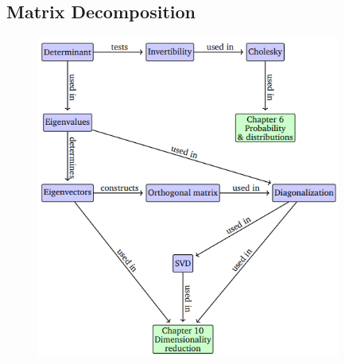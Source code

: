 \subsection{Matrix Decomposition}
\begin{figure}[htbp]
    \centering
    \includegraphics[width=10cm]{Math/matrix-decomposition-map.png}
\end{figure}
